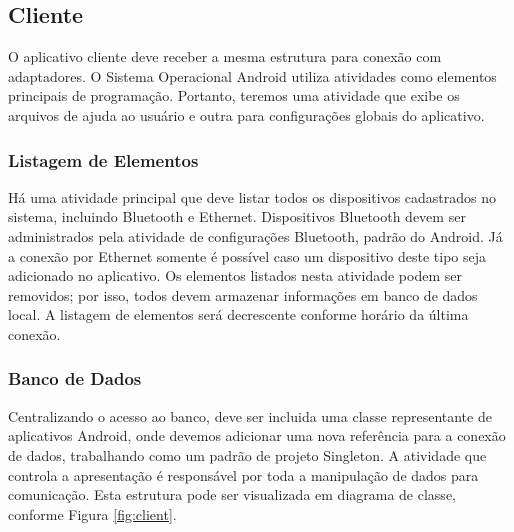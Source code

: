 \documentclass{article}
\begin{document}
\subsection{Cliente}

O aplicativo cliente deve receber a mesma estrutura para conexão com
adaptadores. O Sistema Operacional Android utiliza atividades como elementos
principais de programação. Portanto, teremos uma atividade que exibe os arquivos
de ajuda ao usuário e outra para configurações globais do aplicativo.

\subsubsection{Listagem de Elementos}

Há uma atividade principal que deve listar todos os dispositivos cadastrados no
sistema, incluindo Bluetooth e Ethernet. Dispositivos Bluetooth devem ser
administrados pela atividade de configurações Bluetooth, padrão do Android. Já a
conexão por Ethernet somente é possível caso um dispositivo deste tipo seja
adicionado no aplicativo. Os elementos listados nesta atividade podem ser
removidos; por isso, todos devem armazenar informações em banco de dados local.
A listagem de elementos será decrescente conforme horário da última conexão.

\subsubsection{Banco de Dados}

Centralizando o acesso ao banco, deve ser incluida uma classe representante de
aplicativos Android, onde devemos adicionar uma nova referência para a conexão
de dados, trabalhando como um padrão de projeto Singleton. A atividade que
controla a apresentação é responsável por toda a manipulação de dados para
comunicação. Esta estrutura pode ser visualizada em diagrama de classe, conforme
Figura \ref{fig:client}.
\end{document}
